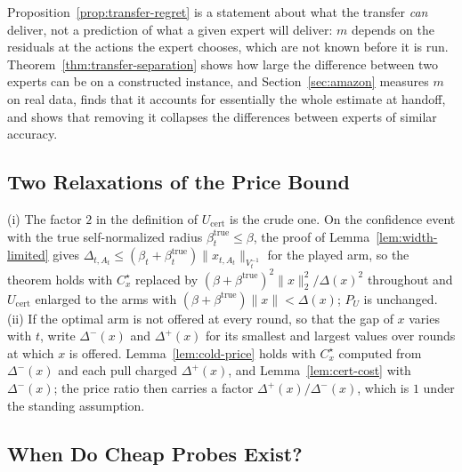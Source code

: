 \documentclass[anon]{alt2027} %
\begin{document}
Proposition~\ref{prop:transfer-regret} is a statement about what the transfer
\emph{can} deliver, not a prediction of what a given expert will deliver: $m$
depends on the residuals at the actions the expert chooses, which are not
known before it is run. Theorem~\ref{thm:transfer-separation} shows how large
the difference between two experts can be on a constructed instance, and
Section~\ref{sec:amazon} measures $m$ on real data, finds that it accounts for
essentially the whole estimate at handoff, and shows that removing it
collapses the differences between experts of similar accuracy.


\subsection{Two Relaxations of the Price Bound}
\label{app:relaxations}

\begin{remark}
\label{rem:relaxations}
(i) The factor $2$ in the definition of $U_{\mathrm{cert}}$ is the crude
one. On the confidence event with the true self-normalized radius
$\beta^{\mathrm{true}}_t\le\beta$, the proof of Lemma~\ref{lem:width-limited}
gives $\Delta_{t,A_t}\le(\beta_t+\beta^{\mathrm{true}}_t)\|x_{t,A_t}\|_{V_t^{-1}}$
for the played arm, so the theorem holds with $C^\star_x$ replaced by
$(\beta+\beta^{\mathrm{true}})^2\|x\|_2^2/\Delta(x)^2$ throughout and
$U_{\mathrm{cert}}$ enlarged to the arms with
$(\beta+\beta^{\mathrm{true}})\|x\|<\Delta(x)$; $P_U$ is unchanged. (ii) If the
optimal arm is not offered at every round, so that the gap of $x$ varies
with $t$, write $\Delta^-(x)$ and $\Delta^+(x)$ for its smallest and largest
values over rounds at which $x$ is offered. Lemma~\ref{lem:cold-price} holds
with $C^\star_x$ computed from $\Delta^-(x)$ and each pull charged $\Delta^+(x)$,
and Lemma~\ref{lem:cert-cost} with $\Delta^-(x)$; the price ratio then carries a factor $\Delta^+(x)/\Delta^-(x)$,
which is $1$ under the standing assumption.
\end{remark}

\subsection{When Do Cheap Probes Exist?}
\label{app:cheap-probes}
\end{document}
